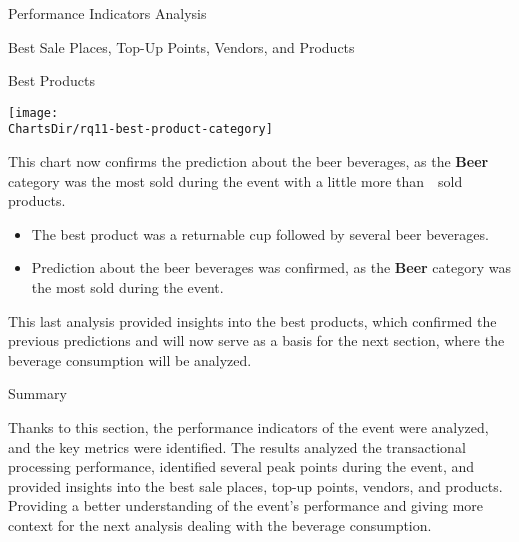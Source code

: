 \begin{section}{Performance Indicators Analysis}
\begin{subsection}{Best Sale Places, Top-Up Points, Vendors, and Products}
\begin{subsubsection}{Best Products}
			\begin{chart}[h]
				\centering
				\texttt{[image: \\ChartsDir/rq11-best-product-category]}
				\caption{ Best Products by Category}
				\label{chart:best-product-category}
				\source
			\end{chart}

			This chart now confirms the prediction about the beer beverages, as the \textbf{Beer} category was the most sold during the event with a little more than~~sold products.

			\begin{keytakeaways}
				\begin{itemize}
					\item The best product was a returnable cup followed by several beer beverages.
					\item Prediction about the beer beverages was confirmed, as the \textbf{Beer} category was the most sold during the event.
				\end{itemize}
			\end{keytakeaways}

			This last analysis provided insights into the best products, which confirmed the previous predictions and will now serve as a basis for the next section, where the beverage consumption will be analyzed.
		\end{subsubsection}
	\end{subsection}

	\begin{subsection}{Summary}
		\label{subsec:analysis-performance-indicators-summary}

		Thanks to this section, the performance indicators of the event were analyzed, and the key metrics were identified.
		The results analyzed the transactional processing performance, identified several peak points during the event, and provided insights into the best sale places, top-up points, vendors, and products.
		Providing a better understanding of the event's performance and giving more context for the next analysis dealing with the beverage consumption.
	\end{subsection}
\end{section}
\pagebreak[4]

